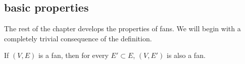 
\subsection{basic properties}

The rest of the chapter develops the properties of fans.  We will begin with
a completely trivial consequence of the definition.

\begin{lemma}[]\label{lemma:subset-fan}
If $(V,E)$ is a fan, then for every $E'\subset E$, $(V,E')$ is also
a fan.
\end{lemma}

